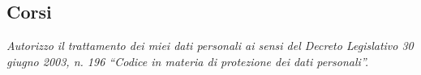 \documentclass[a4paper, 11pt]{moderncv}
\begin{document}
\subsection{Corsi}
\emptysection{}\closesection
\vfill
\begin{center}
\textit{\small Autorizzo il trattamento dei miei dati personali ai sensi del Decreto Legislativo 30 giugno 2003, n. 196 ``Codice in materia di protezione dei dati personali''.}
\end{center}
\end{document}

